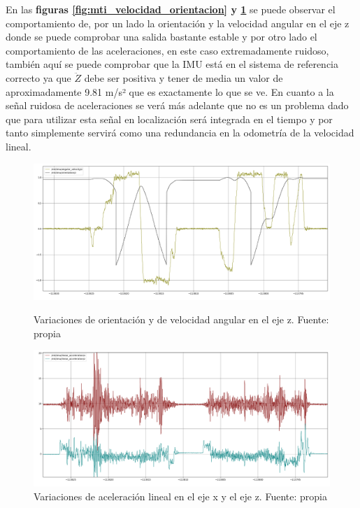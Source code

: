 \newpage
En las \textbf{figuras \ref{fig:mti_velocidad_orientacion} y \ref{fig:mti_aceleraciones}} se puede observar el comportamiento de, por un lado 
la orientación y la velocidad angular en el eje z donde se puede comprobar una salida bastante estable y por otro lado el comportamiento 
de las aceleraciones, en este caso extremadamente ruidoso, también aquí se puede comprobar que la IMU está en el sistema de referencia correcto 
ya que \begin{math}\ddot{Z}\end{math} debe ser positiva y tener de media un valor de aproximadamente 9.81 m/s² que es exactamente lo que se ve. En cuanto a la 
señal ruidosa de aceleraciones se verá más adelante que no es un problema dado que para utilizar esta señal en localización será integrada en el tiempo 
y por tanto simplemente servirá como una redundancia en la odometría de la velocidad lineal.


\begin{figure}[htbp]
  \centering
  \begin{minipage}[b]{0.45\textwidth}
    \centering
    \includegraphics[width=\textwidth]{images/mti_angular_orientation.png}
    \caption{Variaciones de orientación y de velocidad angular en el eje z. Fuente: propia}
    \label{fig:mti_velocidad_orientacion}
  \end{minipage}
  \hfill
  \begin{minipage}[b]{0.45\textwidth}
    \centering
    \includegraphics[width=\textwidth]{images/mti_Acceleration.png}
    \caption{Variaciones de aceleración lineal en el eje x y el eje z. Fuente: propia}
    \label{fig:mti_aceleraciones}
  \end{minipage}
\end{figure}

